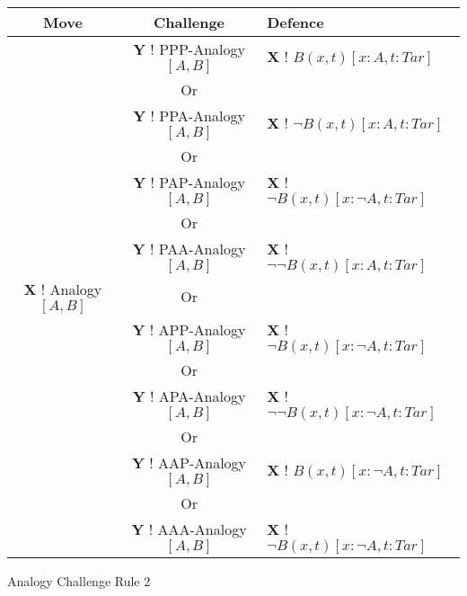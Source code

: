 					\begin{Scheme}[h]  
					\footnotesize   	
        			\centering
               		\begin{tabular}{@{} c|c|l @{}}
               			      \textbf{Move}        &            \textbf{Challenge}            &        \textbf{Defence}         \\ \toprule
               										& \textbf{Y} ! PPP-Analogy$[A,B]$ & \textbf{X} ! $B(x,t)[x : A, t : Tar]$ \\
               			                           &                    Or                    &                                 \\
               			                           & \textbf{Y} ! PPA-Analogy$[A,B]$ & \textbf{X} ! $\neg B(x,t)[x : A, t : Tar]$ \\
               			                           &                    Or                    &                                 \\
               			                           & \textbf{Y} ! PAP-Analogy$[A,B]$ & \textbf{X} ! $\neg B(x,t)[x : \neg A, t : Tar]$ \\
               			                           &                    Or                    &                                 \\
               			                           & \textbf{Y} ! PAA-Analogy$[A,B]$ & \textbf{X} ! $\neg \neg B(x,t)[x : A, t : Tar]$ \\
               			\textbf{X} ! Analogy$[A,B]$&                    Or                    &                                 \\
               			                           & \textbf{Y} ! APP-Analogy$[A,B]$ & \textbf{X} ! $\neg B(x,t)[x : \neg A, t : Tar]$ \\
               			                           &                    Or                    &                                 \\
               			                           & \textbf{Y} ! APA-Analogy$[A,B]$ & \textbf{X} ! $\neg \neg B(x,t)[x : \neg A, t : Tar]$ \\
               			                           &                    Or                    &                                 \\
               			                           & \textbf{Y} ! AAP-Analogy$[A,B]$ & \textbf{X} ! $B(x,t)[x : \neg A, t : Tar]$ \\
               			                           &                    Or                    &                                 \\
               			                           & \textbf{Y} ! AAA-Analogy$[A,B]$ & \textbf{X} ! $\neg B(x,t)[x : \neg A, t : Tar]$ \\ \bottomrule
               		\end{tabular}	
               		\caption{Analogy Challenge Rule 2}
                	\label{AnalogyChallengeRule2}
					\end{Scheme}

